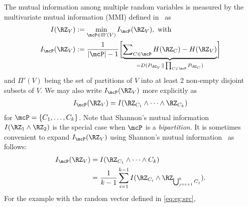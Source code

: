 \documentclass[conference,letterpaper]{IEEEtran}
\begin{document}
The mutual information among multiple random variables is measured by the multivariate mutual information (MMI) defined in~\cite{chan15mi} as
\begin{subequations}
	\label{eq:mmi}
	\begin{align}
		I(\RZ_V) & := \min_{\mcP\in\Pi'(V)}I_{\mcP}(\RZ_V), \text{ with }\label{eq:I}\\
		I_{\mcP}(\RZ_V) & :=\frac{1}{|\mcP|-1}\biggl[\underbrace{\sum\nolimits_{C\in\mcP}H(\RZ_C)-H(\RZ_V)}_{=D(P_{\RZ_V}\|\prod_{C\in \mcP} P_{\RZ_C})}\biggr]\label{eq:IP}
	\end{align}
\end{subequations}
and $\Pi'(V)$ being the set of partitions of $V$ into at least 2 non-empty disjoint subsets of $V$. We may also write $I_{\mcP}(\RZ_V)$ more explicitly as 
\begin{align}
	I_{\mcP}(\RZ_V) = I(\RZ_{C_1}\wedge \dots \wedge \RZ_{C_k})\label{eq:IP:a}
\end{align}
for $\mcP=\Set{C_1,\dots,C_k}$. Note that Shannon's mutual information
$I(\RZ_1\wedge \RZ_2)$ is the special case when $\mcP$ is a
\emph{bipartition}. It is sometimes convenient to expand $I_{\mcP}(\RZ_V)$ using Shannon's mutual information~\cite[(5.18)]{chan15mi} as follows: 
\begin{align}
	I_{\mcP}(\RZ_V)&=I(\RZ_{C_1}\wedge \cdots \wedge C_k) \notag\\
	&= \frac1{k-1}\sum_{i=1}^{k-1} I(\RZ_{C_i} \wedge \RZ_{\bigcup_{j=i+1}^k C_j}). \label{eq:IPchain}
\end{align}
For the example with the random vector defined in \eqref{eq:eg:src},
\end{document}
